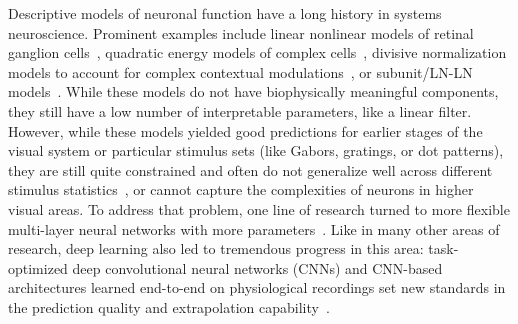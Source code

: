 \documentclass[B2,COG]{ercgrant}
\begin{document}
Descriptive models of neuronal function have a long history in systems neuroscience.
Prominent examples include linear nonlinear models of retinal ganglion cells~\parencite{Paninski2004-ax,Pillow2008-me}, quadratic energy models of complex cells~\parencite{Adelson1985-re}, divisive normalization models to account for complex contextual modulations~\parencite{Heeger1992-xx}, or subunit/LN-LN models~\parencite{Rust2005-ro,Touryan2005-pi,Vintch2015-gc}.
While these models do not have biophysically meaningful components, they still have a low number of interpretable parameters, like a linear filter. 
However, while these models yielded good predictions for earlier stages of the visual system or particular stimulus sets (like Gabors, gratings, or dot patterns), they are still quite constrained and often do not generalize well across different stimulus statistics~\parencite{Fournier2011-pl}, or cannot capture the complexities of neurons in higher visual areas.
To address that problem, one line of research  turned to more flexible multi-layer neural networks with more parameters~\parencite{Zipser1988-nh,Lehky1992-wf,Lau2002-gb,Prenger2004-qu}.
Like in many other areas of research, deep learning also led to tremendous progress in this area: task-optimized deep convolutional neural networks (CNNs) \parencite{Yamins2014-cg,Cadieu2014-gc,Cadena2017-rb} and CNN-based architectures learned end-to-end on physiological recordings set new standards in the prediction quality and extrapolation capability~\parencite{Antolik2016-va,Batty2016-do,McIntosh2016-tr,Klindt2017-sb,Kindel2017-xs,Cadena2017-rb,Burg2021-yg, Lurz2020-ua, Bashiri2021-or,Zhang2018-cs,Cowley2020-cy,Ecker2018-gz, Sinz2018-sk, Walker2019-yw, Franke2022-do}. 
\end{document}
